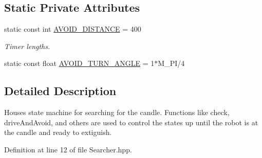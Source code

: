 \subsection*{Static Private Attributes}
\begin{DoxyCompactItemize}
\item 
static const int \hyperlink{classSearcher_ae0cc94f0e90c705ee21da7abf58fcc22}{A\-V\-O\-I\-D\-\_\-\-D\-I\-S\-T\-A\-N\-C\-E} = 400
\begin{DoxyCompactList}\small\item\em Timer lengths. \end{DoxyCompactList}\item 
static const float \hyperlink{classSearcher_afbe5b3bf208f18f77a3dcdb0aa86a96c}{A\-V\-O\-I\-D\-\_\-\-T\-U\-R\-N\-\_\-\-A\-N\-G\-L\-E} = 1$\ast$M\-\_\-\-P\-I/4
\end{DoxyCompactItemize}


\subsection{Detailed Description}
Houses state machine for searching for the candle. Functions like check, drive\-And\-Avoid, and others are used to control the states up until the robot is at the candle and ready to extiguish. 

Definition at line 12 of file Searcher.\-hpp.



